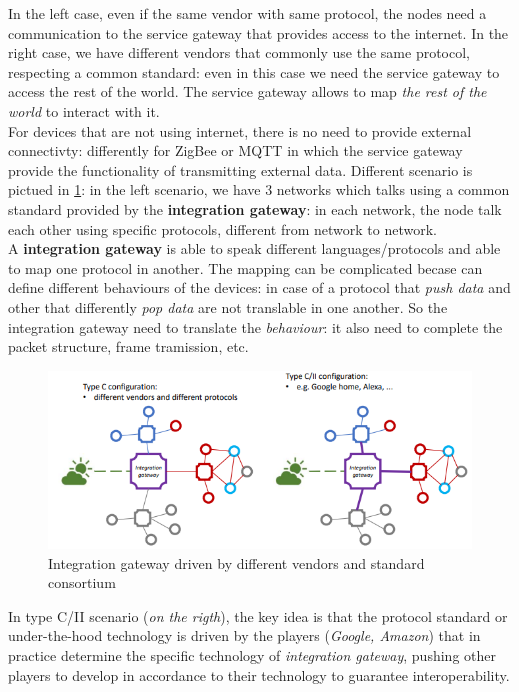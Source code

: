 \documentclass[10pt,a4paper]{report}
\theoremstyle{definition}
\begin{document}
In the left case, even if the same vendor with same protocol, the nodes need a communication to the service gateway that provides access to the internet.
In the right case, we have different vendors that commonly use the same protocol, respecting a common standard: even in this case we need the service gateway to access the rest of the world. The service gateway allows to map \textit{the rest of the world} to interact with it.\\
For devices that are not using internet, there is no need to provide external connectivty: differently for ZigBee or MQTT in which the service gateway provide the functionality of transmitting external data.
Different scenario is pictued in \ref{etherogeneous-conf}: in the left scenario, we have 3 networks which talks using a common standard provided by the \textbf{integration gateway}: in each network, the node talk each other using specific protocols, different from network to network.\\
A \textbf{integration gateway} is able to speak different languages/protocols and able to map one protocol in another. The mapping can be complicated becase can define different behaviours of the devices: in case of a protocol that \textit{push data} and other that differently \textit{pop data} are not translable in one another. So the integration gateway need to translate the \textit{behaviour}: it also need to complete the packet structure, frame tramission, etc.
\begin{figure}
	\centering\includegraphics[scale=0.70]{images/Pasted image 20230228112743.png}
	\caption{Integration gateway driven by different vendors and standard consortium}\label{etherogeneous-conf}
\end{figure}
In type C/II scenario (\textit{on the rigth}), the key idea is that the protocol standard or under-the-hood technology is driven by the players (\textit{Google, Amazon}) that in practice determine the specific technology of \textit{integration gateway}, pushing other players to develop in accordance to their technology to guarantee interoperability.
\end{document}

